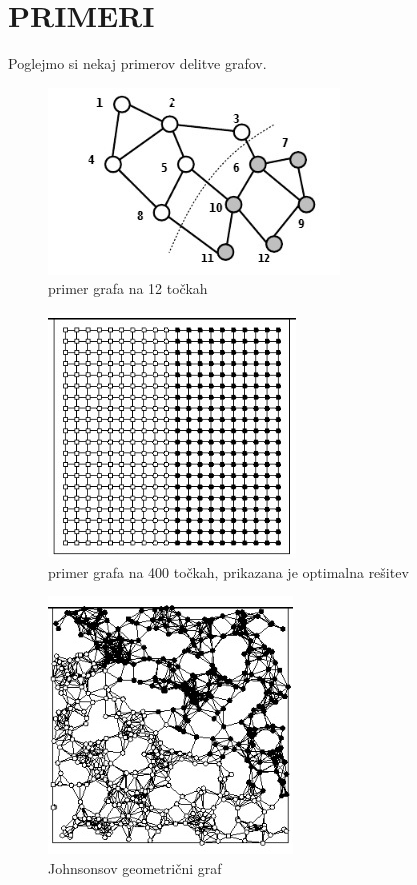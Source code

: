 \documentclass[12pt,a4paper]{amsart}
\theoremstyle{definition} %
\theoremstyle{plain} %
\begin{document}
\section{\textbf{PRIMERI}}
Poglejmo si nekaj primerov delitve grafov. 
\pagebreak
\begin{figure}[h]
    \centering
    \includegraphics{prvi_graf} 
    \caption{primer grafa na 12 točkah}
    \label{fig:1_graf}
\end{figure}

\begin{figure}[h]
    \centering
    \includegraphics{drugi_graf} 
    \caption{primer grafa na 400 točkah, prikazana je optimalna rešitev}
    \label{fig:2_graf}
\end{figure}

\begin{figure}[h]
    \centering
    \includegraphics{tretji_graf} 
    \caption{Johnsonsov geometrični graf}
    \label{fig:3_graf}
\end{figure}
\end{document}
